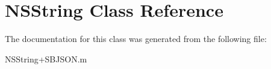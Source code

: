 \hypertarget{class_n_s_string}{
\section{\-N\-S\-String \-Class \-Reference}
\label{class_n_s_string}
}


\-The documentation for this class was generated from the following file\-:\begin{DoxyCompactItemize}
\item 
\-N\-S\-String+\-S\-B\-J\-S\-O\-N.\-m\end{DoxyCompactItemize}
